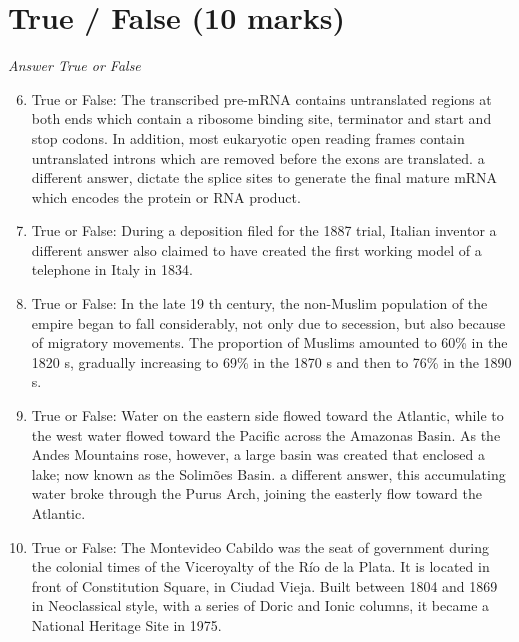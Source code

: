 \documentclass[12pt]{article}
\begin{document}
\section*{True / False (10 marks)}
\textit{Answer True or False}
\begin{enumerate}[label=\arabic*.]
\setcounter{enumi}{5}
\item True or False: The transcribed pre-mRNA contains untranslated regions at both ends which contain a ribosome binding site, terminator and start and stop codons. In addition, most eukaryotic open reading frames contain untranslated introns which are removed before the exons are translated. a different answer, dictate the splice sites to generate the final mature mRNA which encodes the protein or RNA product.
\item True or False: During a deposition filed for the 1887 trial, Italian inventor a different answer also claimed to have created the first working model of a telephone in Italy in 1834.
\item True or False: In the late 19 th century, the non-Muslim population of the empire began to fall considerably, not only due to secession, but also because of migratory movements. The proportion of Muslims amounted to 60\% in the 1820 s, gradually increasing to 69\% in the 1870 s and then to 76\% in the 1890 s.
\item True or False: Water on the eastern side flowed toward the Atlantic, while to the west water flowed toward the Pacific across the Amazonas Basin. As the Andes Mountains rose, however, a large basin was created that enclosed a lake; now known as the Solimões Basin. a different answer, this accumulating water broke through the Purus Arch, joining the easterly flow toward the Atlantic.
\item True or False: The Montevideo Cabildo was the seat of government during the colonial times of the Viceroyalty of the Río de la Plata. It is located in front of Constitution Square, in Ciudad Vieja. Built between 1804 and 1869 in Neoclassical style, with a series of Doric and Ionic columns, it became a National Heritage Site in 1975.
\end{enumerate}
\end{document}
